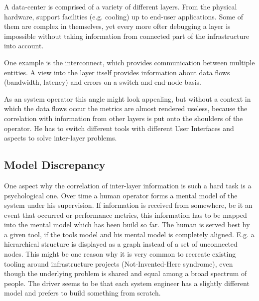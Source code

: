 A data-center is comprised of a variety of different layers. From the physical hardware, support facilities (e.g. cooling) up to end-user applications.
Some of them are complex in themselves, yet every more ofter debugging a layer is impossible without taking information from connected part of the infrastructure into account.

One example is the interconnect, which provides communication between multiple entities.
A view into the layer itself provides information about data flows (bandwidth, latency) and errors on a switch and end-node basis.

As an system operator this angle might look appealing, but without a context in which the data flows occur the metrics are almost rendered useless, because
the correlation with information from other layers is put onto the shoulders of the operator.
He has to switch different tools with different User Interfaces and aspects to solve inter-layer problems.
\subsection{Model Discrepancy}
One aspect why the correlation of inter-layer information is such a hard task is a psychological one. Over time a human operator forms a mental model
of the system under his supervision. If information is received from somewhere, be it an event that occurred or performance metrics, this information
has to be mapped into the mental model which has been build so far.
The human is served best by a given tool, if the tools model and his mental model is completely aligned.
E.g. a hierarchical structure is displayed as a graph instead of a set of unconnected nodes.
This might be one reason why it is very common to recreate existing tooling around infrastructure projects (Not-Invented-Here syndrome), even though the underlying problem
is shared and equal among a broad spectrum of people. The driver seems to be that each system engineer has a slightly different model and prefers to build something from scratch.



